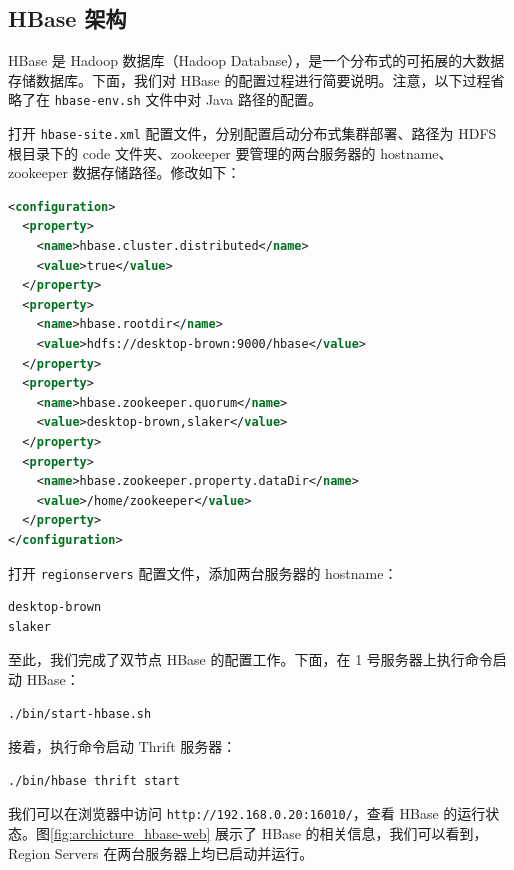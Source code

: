 \documentclass{ctexart}
\newcommand{\code}[1]{\colorbox{backcolor}{\lstinline|#1|}}
\begin{document}
    \subsection{HBase 架构}\label{subsec:archicture_hbase}

    HBase 是 Hadoop 数据库（Hadoop Database），是一个分布式的可拓展的大数据存储数据库\cite{docs-hbase}。下面，我们对 HBase 的配置过程进行简要说明。注意，以下过程省略了在 \code{hbase-env.sh} 文件中对 Java 路径的配置。

    打开 \code{hbase-site.xml} 配置文件，分别配置启动分布式集群部署、路径为 HDFS 根目录下的 code 文件夹、zookeeper 要管理的两台服务器的 hostname、zookeeper 数据存储路径。修改如下：

    \begin{lstlisting}[language=XML]
<configuration>
  <property>
    <name>hbase.cluster.distributed</name>
    <value>true</value>
  </property>
  <property>
    <name>hbase.rootdir</name>
    <value>hdfs://desktop-brown:9000/hbase</value>
  </property>
  <property>
    <name>hbase.zookeeper.quorum</name>
    <value>desktop-brown,slaker</value>
  </property>
  <property>
    <name>hbase.zookeeper.property.dataDir</name>
    <value>/home/zookeeper</value>
  </property>
</configuration>
    \end{lstlisting}

    打开 \code{regionservers} 配置文件，添加两台服务器的 hostname：

    \begin{lstlisting}[language=bash]
desktop-brown
slaker
    \end{lstlisting}

    至此，我们完成了双节点 HBase 的配置工作。下面，在 1 号服务器上执行命令启动 HBase：

    \begin{lstlisting}[language=bash]
./bin/start-hbase.sh
    \end{lstlisting}

    接着，执行命令启动 Thrift 服务器：

    \begin{lstlisting}[language=bash]
./bin/hbase thrift start
    \end{lstlisting}

    我们可以在浏览器中访问 \code{http://192.168.0.20:16010/}，查看 HBase 的运行状态。图\ref{fig:archicture_hbase-web} 展示了 HBase 的相关信息，我们可以看到，Region Servers 在两台服务器上均已启动并运行。
\end{document}
